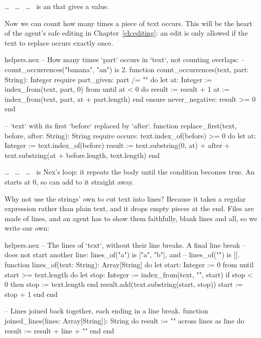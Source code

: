  \ldots\  \ldots\  \ldots\  is
an  that gives a value.

Now we can count how many times a piece of text occurs. This will be the
heart of the agent's safe editing in Chapter~\ref{ch:editing}: an edit is
only allowed if the text to replace occurs exactly once.

\begin{append}{helpers.nex}
-- How many times `part` occurs in `text`, not counting overlaps:
-- count_occurrences("banana", "an") is 2.
function count_occurrences(text, part: String): Integer
require
  part_given: part /= ""
do
  let at: Integer := index_from(text, part, 0)
  from until at < 0 do
    result := result + 1
    at := index_from(text, part, at + part.length)
  end
ensure
  never_negative: result >= 0
end

-- `text` with its first `before` replaced by `after`.
function replace_first(text, before, after: String): String
require
  occurs: text.index_of(before) >= 0
do
  let at: Integer := text.index_of(before)
  result := text.substring(0, at) + after + text.substring(at + before.length, text.length)
end
\end{append}

 \ldots\  \ldots\  \ldots\  is
Nex's loop: it repeats the body until the condition becomes true. An
  starts at 0, so  can
add to it straight away.

Why not use the strings' own  to cut text into lines? Because
it takes a regular expression rather than plain text, and it drops empty
pieces at the end. Files are made of lines, and an agent has to show them
faithfully, blank lines and all, so we write our own:

\begin{append}{helpers.nex}
-- The lines of `text`, without their line breaks. A final line break
-- does not start another line: lines_of("a\nb\n") is ["a", "b"], and
-- lines_of("") is [].
function lines_of(text: String): Array[String] do
  let start: Integer := 0
  from until start >= text.length do
    let stop: Integer := index_from(text, "\n", start)
    if stop < 0 then
      stop := text.length
    end
    result.add(text.substring(start, stop))
    start := stop + 1
  end
end

-- Lines joined back together, each ending in a line break.
function joined_lines(lines: Array[String]): String do
  result := ""
  across lines as line do
    result := result + line + "\n"
  end
end
\end{append}

